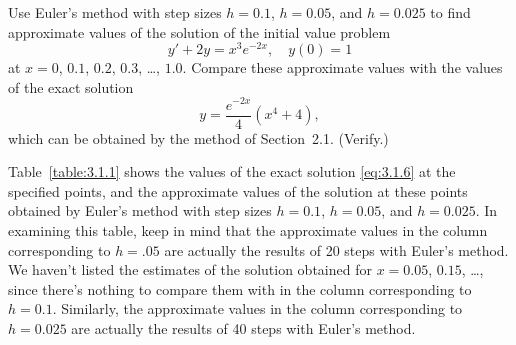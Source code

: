 \setcounter{example}{1}
\setcounter{equation}{5}
\begin{example}
  \label{example:3.1.2} \rm Use Euler's method with step sizes $h=0.1$, $h=0.05$, and $h=0.025$ to
  find approximate values of the solution of the initial value problem
  \[
    y'+2y=x^{3}e^{-2x},\quad y(0)=1
  \]
  at $x=0$, $0.1$, $0.2$, $0.3$, \dots, $1.0$. Compare these approximate values with the values of
  the exact solution
  \begin{equation}
    \label{eq:3.1.6}y=\frac{e^{-2x}}{4}(x^{4}+4),
  \end{equation}
  which can be obtained by the method of Section~2.1. (Verify.)
\end{example}
\setcounter{table}{0}
\begin{examplesolution}
\solution Table~\ref{table:3.1.1} shows the values of the exact solution \eqref{eq:3.1.6} at the
specified points, and the approximate values of the solution at these points obtained by Euler's
method with step sizes $h=0.1$, $h=0.05$, and $h=0.025$. In examining this table, keep in mind that
the approximate values in the column corresponding to $h=.05$ are actually the results of 20 steps
with Euler's method. We haven't listed the estimates of the solution obtained for $x=0.05$, $0.15$,
\dots, since there's nothing to compare them with in the column corresponding to $h=0.1$. Similarly,
the approximate values in the column corresponding to $h=0.025$ are actually the results of 40 steps
with Euler's method.


\end{examplesolution}
